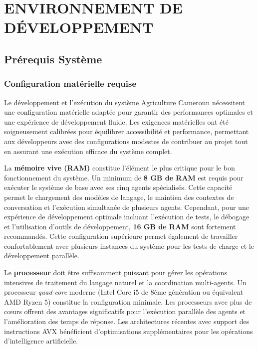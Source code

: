 \chapter{ENVIRONNEMENT DE DÉVELOPPEMENT}


\section{Prérequis Système}

\subsection{Configuration matérielle requise}

Le développement et l'exécution du système Agriculture Cameroun nécessitent une configuration matérielle adaptée pour garantir des performances optimales et une expérience de développement fluide. Les exigences matérielles ont été soigneusement calibrées pour équilibrer accessibilité et performance, permettant aux développeurs avec des configurations modestes de contribuer au projet tout en assurant une exécution efficace du système complet.

La \textbf{mémoire vive (RAM)} constitue l'élément le plus critique pour le bon fonctionnement du système. Un minimum de \textbf{8 GB de RAM} est requis pour exécuter le système de base avec ses cinq agents spécialisés. Cette capacité permet le chargement des modèles de langage, le maintien des contextes de conversation et l'exécution simultanée de plusieurs agents. Cependant, pour une expérience de développement optimale incluant l'exécution de tests, le débogage et l'utilisation d'outils de développement, \textbf{16 GB de RAM} sont fortement recommandés. Cette configuration supérieure permet également de travailler confortablement avec plusieurs instances du système pour les tests de charge et le développement parallèle.

Le \textbf{processeur} doit être suffisamment puissant pour gérer les opérations intensives de traitement du langage naturel et la coordination multi-agents. Un processeur \emph{quad-core} moderne (Intel Core i5 de 8ème génération ou équivalent AMD Ryzen 5) constitue la configuration minimale. Les processeurs avec plus de cœurs offrent des avantages significatifs pour l'exécution parallèle des agents et l'amélioration des temps de réponse. Les architectures récentes avec support des instructions AVX bénéficient d'optimisations supplémentaires pour les opérations d'intelligence artificielle.

